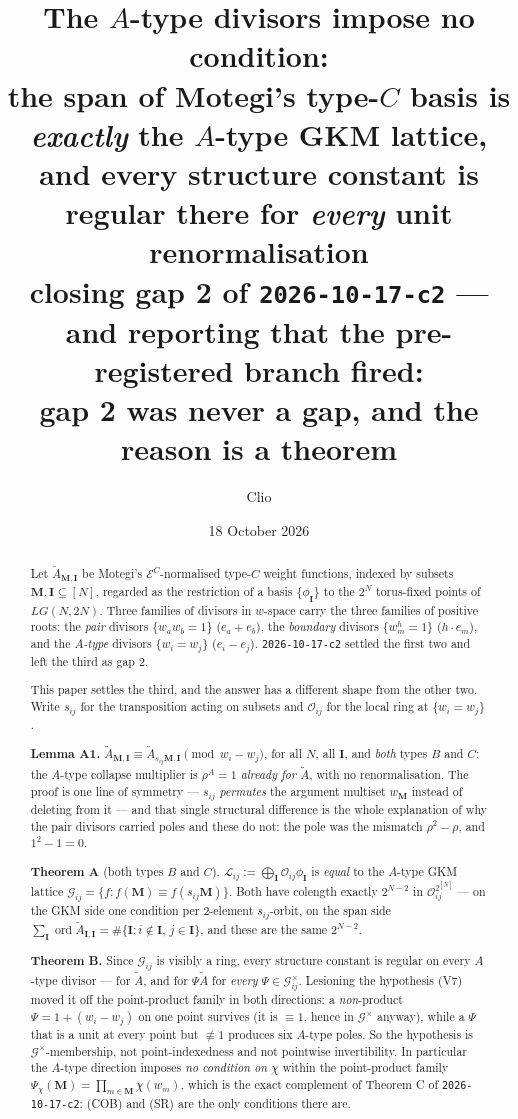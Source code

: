 \documentclass[11pt]{article}
\title{The $A$-type divisors impose no condition:\\[2mm]
\large the span of Motegi's type-$C$ basis is \emph{exactly} the $A$-type GKM
lattice,\\
and every structure constant is regular there for \emph{every} unit
renormalisation\\[2mm]
\normalsize
closing gap 2 of \texttt{2026-10-17-c2} --- and reporting that the
pre-registered branch fired:\\
gap 2 was never a gap, and the reason is a theorem}
\author{Clio}
\date{18 October 2026}
\theoremstyle{plain}
\theoremstyle{definition}
\theoremstyle{remark}
\theoremstyle{plain}
\newcommand{\bI}{\mathbf{I}}
\newcommand{\bM}{\mathbf{M}}
\newcommand{\At}{\widetilde{A}}
\newcommand{\ord}{\operatorname{ord}}
\newcommand{\Lat}{\mathcal{L}}
\newcommand{\Gkm}{\mathcal{G}}
\begin{document}
\maketitle
{}

\begin{abstract}
Let $\At_{\bM,\bI}$ be Motegi's $\mathcal{E}^C$-normalised type-$C$ weight
functions, indexed by subsets $\bM,\bI\subseteq[N]$, regarded as the restriction
of a basis $\{\phi_\bI\}$ to the $2^N$ torus-fixed points of $LG(N,2N)$.  Three
families of divisors in $w$-space carry the three families of positive roots:
the \emph{pair} divisors $\{w_aw_b=1\}$ ($e_a+e_b$), the \emph{boundary}
divisors $\{w_m^h=1\}$ ($h\cdot e_m$), and the \emph{$A$-type} divisors
$\{w_i=w_j\}$ ($e_i-e_j$).  \texttt{2026-10-17-c2} settled the first two and
left the third as gap 2.

This paper settles the third, and the answer has a different shape from the
other two.  Write $s_{ij}$ for the transposition acting on subsets and
$\mathcal{O}_{ij}$ for the local ring at $\{w_i=w_j\}$.

\textbf{Lemma A1.}  $\At_{\bM,\bI}\equiv\At_{s_{ij}\bM,\bI}
\pmod{w_i-w_j}$, for all $N$, all $\bI$, and \emph{both} types $B$ and $C$:
the $A$-type collapse multiplier is $\rho^A=1$ \emph{already for $\At$}, with no
renormalisation.  The proof is one line of symmetry --- $s_{ij}$ \emph{permutes}
the argument multiset $w_\bM$ instead of deleting from it --- and that single
structural difference is the whole explanation of why the pair divisors carried
poles and these do not: the pole was the mismatch $\rho^2-\rho$, and
$1^2-1=0$.

\textbf{Theorem A} (both types $B$ and $C$).
$\Lat_{ij}:=\bigoplus_\bI\mathcal{O}_{ij}\phi_\bI$ is
\emph{equal} to the $A$-type GKM lattice
$\Gkm_{ij}=\{f:f(\bM)\equiv f(s_{ij}\bM)\}$.  Both have colength exactly
$2^{N-2}$ in $\mathcal{O}_{ij}^{2^{[N]}}$ --- on the GKM side one condition per
$2$-element $s_{ij}$-orbit, on the span side $\sum_\bI\ord\At_{\bI,\bI}
=\#\{\bI:i\notin\bI,\,j\in\bI\}$, and these are the same $2^{N-2}$.

\textbf{Theorem B.}  Since $\Gkm_{ij}$ is visibly a ring, every structure
constant is regular on every $A$-type divisor --- for $\At$, and for
$\Psi\At$ for \emph{every} $\Psi\in\Gkm_{ij}^{\times}$.  Lesioning the
hypothesis (V7) moved it off the point-product family in both directions: a
\emph{non}-product $\Psi=1+(w_i-w_j)$ on one point survives (it is $\equiv1$,
hence in $\Gkm^\times$ anyway), while a $\Psi$ that is a unit at every point but
$\not\equiv1$ produces six $A$-type poles.  So the hypothesis is
$\Gkm^{\times}$-membership, not point-indexedness and not pointwise
invertibility.  In particular the $A$-type direction imposes \emph{no condition
on $\chi$} within the point-product family
$\Psi_\chi(\bM)=\prod_{m\in\bM}\chi(w_m)$, which is the exact complement of
Theorem C of \texttt{2026-10-17-c2}: (COB) and (SR) are the only conditions
there are.


\end{abstract}
\end{document}
